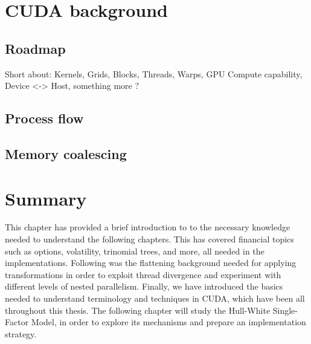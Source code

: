 \section{CUDA background}
\subsection{Roadmap}
Short about: Kernels, Grids, Blocks, Threads, Warps, GPU Compute capability, Device <-> Host, something more ? 
\subsection{Process flow}
\subsection{Memory coalescing}

\section*{Summary}
This chapter has provided a brief introduction to to the necessary knowledge needed to understand the following chapters. This has covered financial topics such as options, volatility, trinomial trees, and more, all needed in the implementations. Following was the flattening background needed for applying transformations in order to exploit thread divergence and experiment with different levels of nested parallelism. Finally, we have introduced the basics needed to understand terminology and techniques in CUDA, which have been all throughout this thesis. The following chapter will study the Hull-White Single-Factor Model, in order to explore its mechanisms and prepare an implementation strategy.